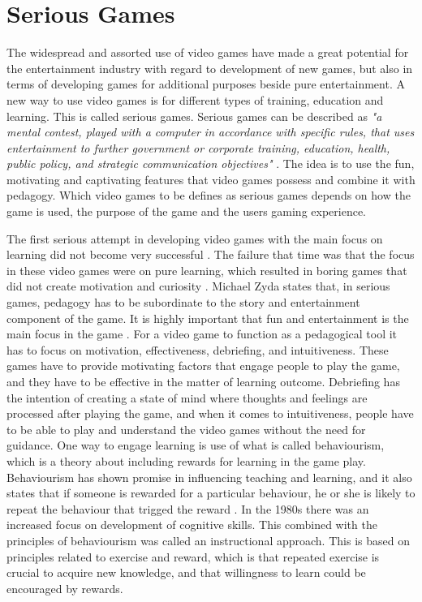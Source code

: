 \section{Serious Games}
\label{sec:sergames}
The widespread and assorted use of video games have made a great potential for the entertainment industry with regard to development of new games, but also in terms of developing games for additional purposes beside pure entertainment. A new way to use video games is for different types of training, education and learning. This is called serious games. Serious games can be described as \emph{"a mental contest, played with a computer in accordance with specific rules, that uses entertainment to further government or corporate training, education, health, public policy, and strategic communication objectives"} \cite{zyda2005visual}. The idea is to use the fun, motivating and captivating features that video games possess and combine it with pedagogy. Which video games to be defines as serious games depends on how the game is used, the purpose of the game and the users gaming experience. 

The first serious attempt in developing video games with the main focus on learning did not become very successful \cite{understandingvg}. The failure that time was that the focus in these  video games were on pure learning, which resulted in boring games that did not create motivation and curiosity \cite{understandingvg} \cite{susi2007serious}. Michael Zyda states that, in serious games, pedagogy has to be subordinate to the story and entertainment component of the game. It is highly important that fun and entertainment is the main focus in the game \cite{zyda2005visual}. For a video game to function as a pedagogical tool it has to focus on motivation, effectiveness, debriefing, and intuitiveness. These games have to provide motivating factors that engage people to play the game, and they have to be effective in the matter of learning outcome. Debriefing has the intention of creating a state of mind where thoughts and feelings are processed after playing the game, and when it comes to intuitiveness, people have to be able to play and understand the video games without the need for guidance. One way to engage learning is use of what is called behaviourism, which is a theory about including rewards for learning in the game play. Behaviourism has shown promise in influencing teaching and learning, and it also states that if someone is rewarded for a particular behaviour, he or she is likely to repeat the behaviour that trigged the reward \cite{behaviour}. In the 1980s there was an increased focus on development of cognitive skills. This combined with the principles of behaviourism was called an instructional approach. This is based on principles related to exercise and reward, which is that repeated exercise is crucial to acquire new knowledge, and that willingness to learn could be encouraged by rewards. 

